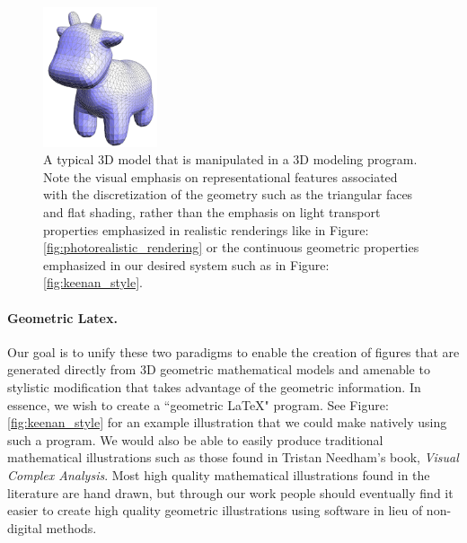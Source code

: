\documentclass[12pt, letterpaper]{article}
\begin{document}
	\begin{figure}[h]
	\centering
	\includegraphics[width=0.3\textwidth]{KeenanCow}
	\caption{A typical 3D model that is manipulated in a 3D modeling program. Note the visual emphasis on representational features associated
			with the discretization of the geometry such as the triangular faces and flat shading, rather than the emphasis on light transport properties emphasized
			in realistic renderings like in Figure: \ref{fig:photorealistic_rendering} or the continuous geometric properties emphasized in our desired system such
			as in Figure: \ref{fig:keenan_style}.}
	\label{fig:keenan_cow}
	\end{figure}

	\paragraph{Geometric Latex.}

	Our goal is to unify these two paradigms to enable the creation of figures that are generated directly from 3D geometric mathematical models 
	and amenable to stylistic modification that takes advantage of the geometric information. In essence, we wish to create a ``geometric \LaTeX" program.
	See Figure: \ref{fig:keenan_style} for an example illustration that
	we could make natively using such a program. We would also be able to easily produce traditional mathematical illustrations such as those found in 
	Tristan Needham's book, \emph{Visual Complex Analysis}. Most high quality mathematical illustrations found in the literature are hand drawn,
	but through our work people should eventually find it easier to create high quality geometric illustrations using software in lieu of non-digital methods.
\end{document}
